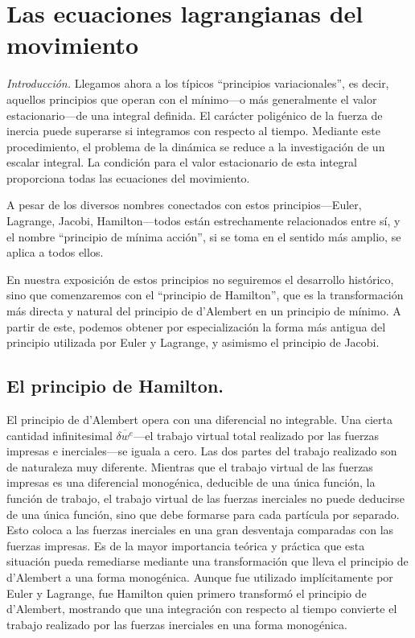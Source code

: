 \documentclass[12pt,a4paper]{book}
\begin{document}
\chapter{Las ecuaciones lagrangianas del movimiento}

\textit{Introducción.} Llegamos ahora a los típicos ``principios variacionales'', es decir, aquellos principios que operan con el mínimo---o más generalmente el valor estacionario---de una integral definida. El carácter poligénico de la fuerza de inercia puede superarse si integramos con respecto al tiempo. Mediante este procedimiento, el problema de la dinámica se reduce a la investigación de un escalar integral. La condición para el valor estacionario de esta integral proporciona todas las ecuaciones del movimiento.

A pesar de los diversos nombres conectados con estos principios---Euler, Lagrange, Jacobi, Hamilton---todos están estrechamente relacionados entre sí, y el nombre ``principio de mínima acción'', si se toma en el sentido más amplio, se aplica a todos ellos.

En nuestra exposición de estos principios no seguiremos el desarrollo histórico, sino que comenzaremos con el ``principio de Hamilton'', que es la transformación más directa y natural del principio de d'Alembert en un principio de mínimo. A partir de este, podemos obtener por especialización la forma más antigua del principio utilizada por Euler y Lagrange, y asimismo el principio de Jacobi.

\section{El principio de Hamilton.}

El principio de d'Alembert opera con una diferencial no integrable. Una cierta cantidad infinitesimal $\overline{\delta w^e}$---el trabajo virtual total realizado por las fuerzas impresas e inerciales---se iguala a cero. Las dos partes del trabajo realizado son de naturaleza muy diferente. Mientras que el trabajo virtual de las fuerzas impresas es una diferencial monogénica, deducible de una única función, la función de trabajo, el trabajo virtual de las fuerzas inerciales no puede deducirse de una única función, sino que debe formarse para cada partícula por separado. Esto coloca a las fuerzas inerciales en una gran desventaja comparadas con las fuerzas impresas. Es de la mayor importancia teórica y práctica que esta situación pueda remediarse mediante una transformación que lleva el principio de d'Alembert a una forma monogénica. Aunque fue utilizado implícitamente por Euler y Lagrange, fue Hamilton quien primero transformó el principio de d'Alembert, mostrando que una integración con respecto al tiempo convierte el trabajo realizado por las fuerzas inerciales en una forma monogénica.
\end{document}
